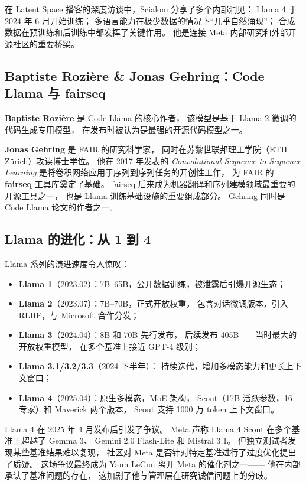 在 Latent Space 播客的深度访谈中，Scialom 分享了多个内部洞见：
Llama 4 于 2024 年 6 月开始训练；
多语言能力在极少数据的情况下``几乎自然涌现''；
合成数据在预训练和后训练中都发挥了关键作用。
他是连接 Meta 内部研究和外部开源社区的重要桥梁。

\subsection{Baptiste Rozi\`ere \& Jonas Gehring：Code Llama 与 fairseq}

\textbf{Baptiste Rozi\`ere} 是 Code Llama 的核心作者，
该模型是基于 Llama 2 微调的代码生成专用模型，
在发布时被认为是最强的开源代码模型之一。

\textbf{Jonas Gehring} 是 FAIR 的研究科学家，
同时在苏黎世联邦理工学院（ETH Z\"urich）攻读博士学位。
他在 2017 年发表的 \textit{Convolutional Sequence to Sequence Learning}
是将卷积网络应用于序列到序列任务的开创性工作，
为 FAIR 的 \textbf{fairseq} 工具库奠定了基础。
fairseq 后来成为机器翻译和序列建模领域最重要的开源工具之一，
也是 Llama 训练基础设施的重要组成部分。
Gehring 同时是 Code Llama 论文的作者之一。

\subsection{Llama 的进化：从 1 到 4}

Llama 系列的演进速度令人惊叹：

\begin{itemize}[noitemsep]
  \item \textbf{Llama 1}（2023.02）：7B--65B，公开数据训练，被泄露后引爆开源生态；
  \item \textbf{Llama 2}（2023.07）：7B--70B，正式开放权重，
    包含对话微调版本，引入 RLHF，与 Microsoft 合作分发；
  \item \textbf{Llama 3}（2024.04）：8B 和 70B 先行发布，
    后续发布 405B——当时最大的开放权重模型，
    在多个基准上接近 GPT-4 级别；
  \item \textbf{Llama 3.1/3.2/3.3}（2024 下半年）：
    持续迭代，增加多模态能力和更长上下文窗口；
  \item \textbf{Llama 4}（2025.04）：原生多模态，MoE 架构，
    Scout（17B 活跃参数，16 专家）和 Maverick 两个版本，
    Scout 支持 1000 万 token 上下文窗口。
\end{itemize}

\begin{whybox}
Llama 4 在 2025 年 4 月发布后引发了争议。
Meta 声称 Llama 4 Scout 在多个基准上超越了 Gemma 3、
Gemini 2.0 Flash-Lite 和 Mistral 3.1。
但独立测试者发现某些基准结果难以复现，
社区对 Meta 是否针对特定基准进行了过度优化提出了质疑。
这场争议最终成为 Yann LeCun 离开 Meta 的催化剂之一——
他在内部承认了基准问题的存在，
这加剧了他与管理层在研究诚信问题上的分歧。
\end{whybox}



